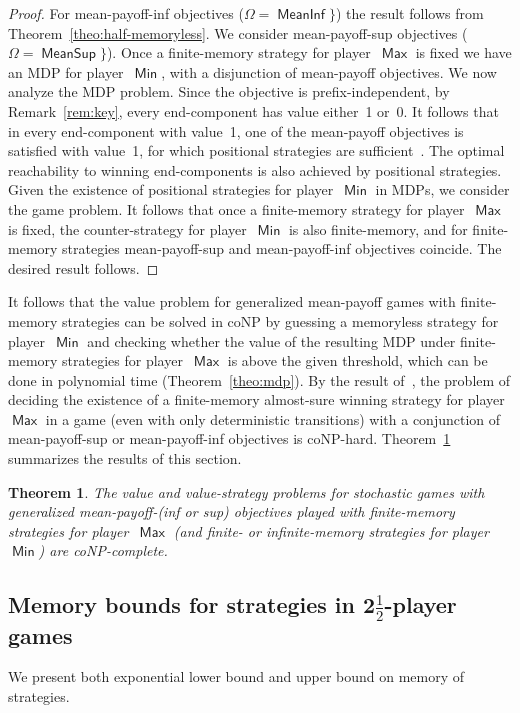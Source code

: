 \documentclass{article}
\newtheorem{theorem}{Theorem}
\newcommand{\half}{$\frac{\text{1}}{\text{2}}$}
\DeclareMathOperator{\ma}{\mathsf{Max}}
\DeclareMathOperator{\mi}{\mathsf{Min}}
\newcommand{\MeanSup}{\operatorname{\mathsf{MeanSup}}}
\newcommand{\MeanInf}{\operatorname{\mathsf{MeanInf}}}
\begin{document}
\begin{proof}
For mean-payoff-inf objectives ($\Omega = \MeanInf\}$) the result follows
from Theorem~\ref{theo:half-memoryless}.
We consider mean-payoff-sup objectives ($\Omega = \MeanSup\}$).
Once a finite-memory strategy for player~$\ma$ is fixed we have an MDP
for player~$\mi$, with a disjunction of mean-payoff objectives.
We now analyze the MDP problem.
Since the objective is prefix-independent, by Remark~\ref{rem:key}, 
every end-component has value either~1 or~0. 
It follows that in every end-component with value~1, one of the mean-payoff 
objectives is satisfied with value~1, for which positional strategies are 
sufficient~\cite{FV97,Puterman}.
The optimal reachability to winning end-components is also achieved by
positional strategies. 
Given the existence of positional strategies for player~$\mi$ in MDPs, we
consider the game problem.
It follows that once a finite-memory strategy for player~$\ma$ is fixed, the 
counter-strategy for player~$\mi$ is also finite-memory, and for finite-memory
strategies mean-payoff-sup and mean-payoff-inf objectives coincide.
The desired result follows.
\end{proof}


It follows that the value problem for generalized mean-payoff games
with finite-memory strategies can be solved in coNP by guessing a memoryless
strategy for player~$\mi$ and checking whether the value of the resulting
MDP under finite-memory strategies for player~$\ma$ is above the given threshold, 
which can be done in polynomial time (Theorem~\ref{theo:mdp}).
By the result of~\cite[Lemma~5, Lemma~6]{VCDHRR15}, the problem of deciding
the existence of a finite-memory almost-sure winning strategy for player~$\ma$ in a game 
(even with only deterministic transitions) with a conjunction of mean-payoff-sup 
or mean-payoff-inf objectives is coNP-hard. 
Theorem~\ref{theo:finite-coNP-complete} summarizes the results of this section.



\begin{theorem}\label{theo:finite-coNP-complete}
The value and value-strategy problems for stochastic games
with generalized mean-payoff-(inf or sup) objectives 
played with finite-memory strategies for player~$\ma$ 
(and finite- or infinite-memory strategies for player~$\mi$) 
are coNP-complete.
\end{theorem}




\subsection{Memory bounds for strategies in 2\half-player games}\label{sec:membou}
We present both exponential lower bound and upper bound on memory of strategies.
\end{document}
